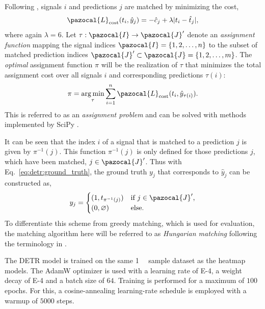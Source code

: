 Following \cite{10.1007/978-3-030-58452-8_13}, signals $i$ and predictions $j$ are matched by minimizing the cost,
\begin{equation}
	\pazocal{L}_\text{cost}(t_i, \hat{y}_j) = -\hat{c}_j + \lambda|t_i-\hat{t}_j|,
\end{equation}
where again $\lambda=6$.
Let $\tau:\pazocal{I}\rightarrow\pazocal{J}'$ denote an \emph{assignment function} mapping the signal indices $\pazocal{I} = \{1, 2, \dots, n\}$ to the subset of matched prediction indices $\pazocal{J}' \subset\pazocal{J} = \{1, 2, \dots, m\}$. The \emph{optimal} assignment function $\pi$ will be the realization of $\tau$ that minimizes the total assignment cost over all signals $i$ and corresponding predictions $\tau(i)$:
\begin{equation}
	\pi = \argmin_\tau \sum_{i=1}^n \pazocal{L}_\text{cost}(t_i, \hat{y}_{\tau(i)}).
\end{equation}
This is referred to as an \emph{assignment problem} and can be solved with methods implemented by SciPy \cite{2020SciPy-NMeth}. 

It can be seen that the index $i$ of a signal that is matched to a prediction $j$ is given by $\pi^{-1}(j)$. This function $\pi^{-1}(j)$ is only defined for those predictions $j$, which have been matched, $j\in\pazocal{J}'$. Thus with Eq.~\ref{eq:detr:ground_truth}, the ground truth $y_j$ that corresponds to $\hat{y}_j$ can be constructed as,
\begin{equation}
	y_j = \begin{cases}
		(1, t_{\pi^{-1}(j)}) & \text{if $j\in\pazocal{J}'$,} \\
		(0, \varnothing) & \text{else.}
	\end{cases}
\end{equation}
To differentiate this scheme from greedy matching, which is used for evaluation, the matching algorithm here will be referred to as \emph{Hungarian matching} following the terminology in \cite{10.1007/978-3-030-58452-8_13}.


The DETR model is trained on the same \SI{1}{\mega\nothing} sample dataset as the heatmap models. The AdamW optimizer is used with a learning rate of \SI{E-4}{}, a weight decay of \SI{E-4}{} and a batch size of $64$. Training is performed for a maximum of $100$ epochs. For this, a cosine-annealing learning-rate schedule is employed with a warmup of $5000$ steps. 

